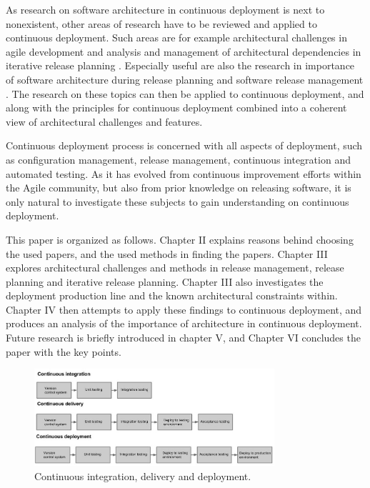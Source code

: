 \documentclass[conference]{IEEEtran}
\begin{document}
As research on software architecture in continuous deployment is next to nonexistent, other areas of research have to be reviewed and applied to continuous deployment. Such areas are for example architectural challenges in agile development \cite{kruchten2010software} and analysis and management of architectural dependencies in iterative release planning \cite{brown2011analysis}. Especially useful are also the research in importance of software architecture during release planning \cite{lindgren2008importance} and software release management \cite{van1997software}. The research on these topics can then be applied to continuous deployment, and along with the principles for continuous deployment \cite{humble2006deployment} combined into a coherent view of architectural challenges and features. 

Continuous deployment process is concerned with all aspects of deployment, such as configuration management, release management, continuous integration and automated testing. As it has evolved from continuous improvement efforts within the Agile community, but also from prior knowledge on releasing software, it is only natural to investigate these subjects to gain understanding on continuous deployment.

This paper is organized as follows. Chapter II explains reasons behind choosing the used papers, and the used methods in finding the papers. Chapter III explores architectural challenges and methods in release management, release planning and iterative release planning. Chapter III also investigates the deployment production line and the known architectural constraints within. Chapter IV then attempts to apply these findings to continuous deployment, and produces an analysis of the importance of architecture in continuous deployment. Future research is briefly introduced in chapter V, and Chapter VI concludes the paper with the key points.  

\begin{figure}[!t]
	\centering
	\includegraphics[width=3.5in]{rtvd.jpg}
	\caption{Continuous integration, delivery and deployment.}
	\label{fig1}
\end{figure}
\end{document}

